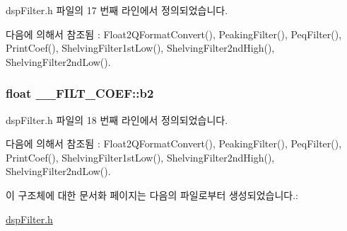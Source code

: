 dsp\+Filter.\+h 파일의 17 번째 라인에서 정의되었습니다.



다음에 의해서 참조됨 \+:  Float2\+Q\+Format\+Convert(), Peaking\+Filter(), Peq\+Filter(), Print\+Coef(), Shelving\+Filter1st\+Low(), Shelving\+Filter2nd\+High(), Shelving\+Filter2nd\+Low().

\hypertarget{struct_____f_i_l_t___c_o_e_f_a5d1f0db7785187119dbdd01681d9d230}{
\subsubsection[{b2}]{\setlength{\rightskip}{0pt plus 5cm}float \+\_\+\+\_\+\+F\+I\+L\+T\+\_\+\+C\+O\+E\+F\+::b2}}\label{struct_____f_i_l_t___c_o_e_f_a5d1f0db7785187119dbdd01681d9d230}


dsp\+Filter.\+h 파일의 18 번째 라인에서 정의되었습니다.



다음에 의해서 참조됨 \+:  Float2\+Q\+Format\+Convert(), Peaking\+Filter(), Peq\+Filter(), Print\+Coef(), Shelving\+Filter1st\+Low(), Shelving\+Filter2nd\+High(), Shelving\+Filter2nd\+Low().



이 구조체에 대한 문서화 페이지는 다음의 파일로부터 생성되었습니다.\+:\begin{DoxyCompactItemize}
\item 
\hyperlink{dsp_filter_8h}{dsp\+Filter.\+h}\end{DoxyCompactItemize}
